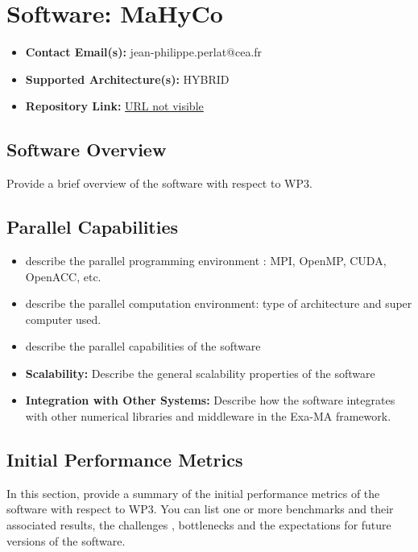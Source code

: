 \section{Software: MaHyCo}
\label{sec:WP3:MaHyCo:software}

\begin{itemize}
    \item \textbf{Contact Email(s):} jean-philippe.perlat@cea.fr
    \item \textbf{Supported Architecture(s):} HYBRID
    \item \textbf{Repository Link:} \href{URL not visible}{URL not visible}
\end{itemize}

\subsection{Software Overview}
\label{sec:WP3:MaHyCo:summary}

Provide a brief overview of the software with respect to WP3.

\subsection{Parallel Capabilities}
\label{sec:WP3:MaHyCo:performances}


\begin{itemize}
    \item describe the parallel programming  environment : MPI, OpenMP, CUDA, OpenACC, etc.
    \item describe the parallel computation environment: type of architecture and super computer used.
    \item describe the parallel capabilities of the software
    \item \textbf{Scalability:} Describe the general scalability properties of the software
    \item \textbf{Integration with Other Systems:} Describe how the software integrates with other numerical libraries and middleware in the Exa-MA framework.
\end{itemize}

\subsection{Initial Performance Metrics}
\label{sec:WP3:MaHyCo:metrics}

In this section, provide a summary of the initial performance metrics of the software with respect to WP3.
You can list one or more benchmarks and their associated results, the challenges , bottlenecks and the expectations for future versions of the software.



